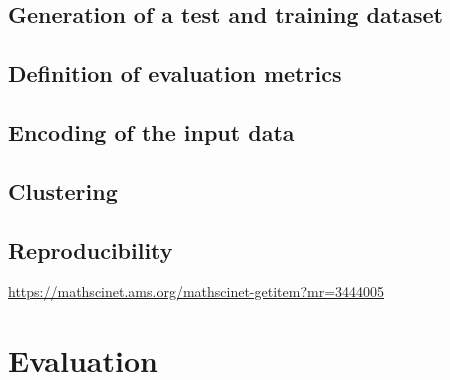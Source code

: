 \subsection{Generation of a test and training dataset}
\subsection{Definition of evaluation metrics}
\subsection{Encoding of the input data}
\subsection{Clustering}
\subsection{Reproducibility}
\url{https://mathscinet.ams.org/mathscinet-getitem?mr=3444005}

\section{Evaluation}\label{sec:eval}

